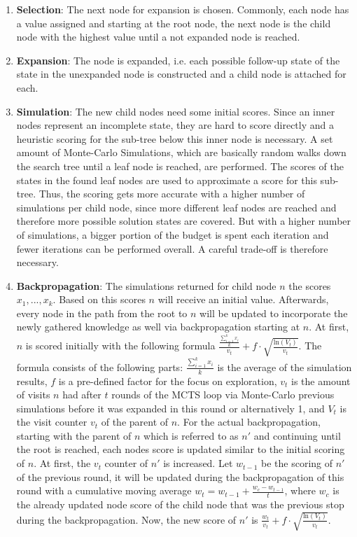 \begin{enumerate}
    \item \textbf{Selection}: The next node for expansion is chosen.
    Commonly, each node has a value assigned and starting at the root node, the next node is the child node with the highest value until a not expanded node is reached.
    \item \textbf{Expansion}: The node is expanded, i.e. each possible follow-up state of the state in the unexpanded node is constructed and a child node is attached for each.
    \item \textbf{Simulation}: The new child nodes need some initial scores.
    Since an inner nodes represent an incomplete state, they are hard to score directly and a heuristic scoring for the sub-tree below this inner node is necessary.
    A set amount of Monte-Carlo Simulations, which are basically random walks down the search tree until a leaf node is reached, are performed.
    The scores of the states in the found leaf nodes are used to approximate a score for this sub-tree.
    Thus, the scoring gets more accurate with a higher number of simulations per child node, since more different leaf nodes are reached and therefore more possible solution states are covered.
    But with a higher number of simulations, a bigger portion of the budget is spent each iteration and fewer iterations can be performed overall.
    A careful trade-off is therefore necessary.
    \item \textbf{Backpropagation}: The simulations returned for child node $n$ the scores $x_1, ..., x_k$.
    Based on this scores $n$ will receive an initial value.
    Afterwards, every node in the path from the root to $n$ will be updated to incorporate the newly gathered knowledge as well via backpropagation starting at $n$.
    At first, $n$ is scored initially with the following formula $\frac{\frac{\sum_{i=1}^k x_i}{k}}{v_t} + f \cdot \sqrt{\frac{\mathrm{ln} (V_t)}{v_t}}$.
    The formula consists of the following parts: $\frac{\sum_{i=1}^k x_i}{k}$ is the average of the simulation results, $f$ is a pre-defined factor for the focus on exploration, $v_t$ is the amount of visits $n$ had after $t$ rounds of the MCTS loop via Monte-Carlo previous simulations before it was expanded in this round or alternatively 1, and $V_t$ is the visit counter $v_t$ of the parent of $n$.
    For the actual backpropagation, starting with the parent of $n$ which is referred to as $n'$ and continuing until the root is reached, each nodes score is updated similar to the initial scoring of $n$.
    At first, the $v_t$ counter of $n'$ is increased.
    Let $w_{t-1}$ be the scoring of $n'$ of the previous round, it will be updated during the backpropagation of this round with a cumulative moving average $w_t=w_{t-1} + \frac{w_c - w_{t-1}}{t}$, where $w_c$ is the already updated node score of the child node that was the previous stop during the backpropagation.
    Now, the new score of $n'$ is $\frac{w_t}{v_t} + f \cdot \sqrt{\frac{\mathrm{ln} (V_t)}{v_t}}$.
\end{enumerate}
